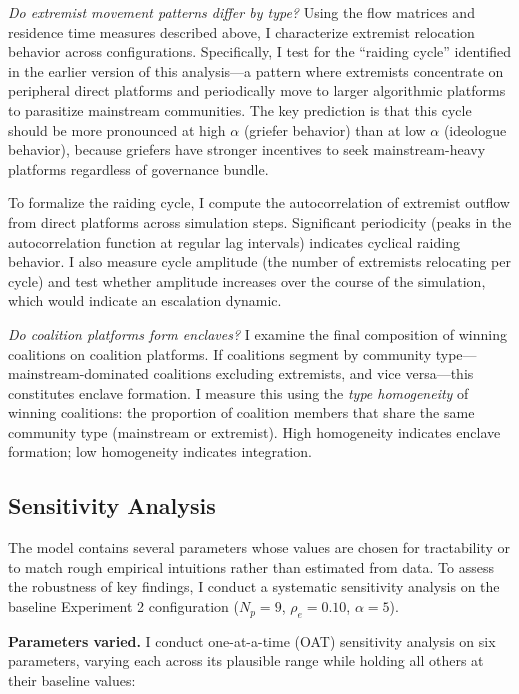 \documentclass{article}
\begin{document}
\textit{Do extremist movement patterns differ by type?} Using the flow matrices and residence time measures described above, I characterize extremist relocation behavior across configurations. Specifically, I test for the ``raiding cycle'' identified in the earlier version of this analysis---a pattern where extremists concentrate on peripheral direct platforms and periodically move to larger algorithmic platforms to parasitize mainstream communities. The key prediction is that this cycle should be more pronounced at high $\alpha$ (griefer behavior) than at low $\alpha$ (ideologue behavior), because griefers have stronger incentives to seek mainstream-heavy platforms regardless of governance bundle.

To formalize the raiding cycle, I compute the autocorrelation of extremist outflow from direct platforms across simulation steps. Significant periodicity (peaks in the autocorrelation function at regular lag intervals) indicates cyclical raiding behavior. I also measure cycle amplitude (the number of extremists relocating per cycle) and test whether amplitude increases over the course of the simulation, which would indicate an escalation dynamic.

\textit{Do coalition platforms form enclaves?} I examine the final composition of winning coalitions on coalition platforms. If coalitions segment by community type---mainstream-dominated coalitions excluding extremists, and vice versa---this constitutes enclave formation. I measure this using the \textit{type homogeneity} of winning coalitions: the proportion of coalition members that share the same community type (mainstream or extremist). High homogeneity indicates enclave formation; low homogeneity indicates integration.

\subsection{Sensitivity Analysis}
\label{app:sensitivity}

The model contains several parameters whose values are chosen for tractability or to match rough empirical intuitions rather than estimated from data. To assess the robustness of key findings, I conduct a systematic sensitivity analysis on the baseline Experiment 2 configuration ($N_p = 9$, $\rho_e = 0.10$, $\alpha = 5$).

\textbf{Parameters varied.} I conduct one-at-a-time (OAT) sensitivity analysis on six parameters, varying each across its plausible range while holding all others at their baseline values:
\end{document}
